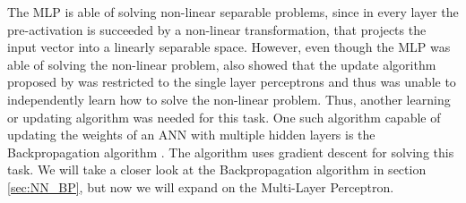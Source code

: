     The MLP is able of solving non-linear separable problems, since in every layer the pre-activation is succeeded by a non-linear transformation, that projects the input vector into a linearly separable space. However, even though the MLP was able of solving the non-linear problem, \cite{Min69} also showed that the update algorithm proposed by \cite{Rosenblatt1958:} was restricted to the single layer perceptrons and thus was unable to independently learn how to solve the non-linear problem. 
    Thus, another learning or updating algorithm was needed for this task. One such algorithm capable of updating the weights of an ANN with multiple hidden layers is the Backpropagation algorithm \cite{Rumelheart_1986}. The algorithm uses gradient descent for solving this task. We will take a closer look at the Backpropagation algorithm in section \ref{sec:NN_BP}, but now we will expand on the Multi-Layer Perceptron.
    
